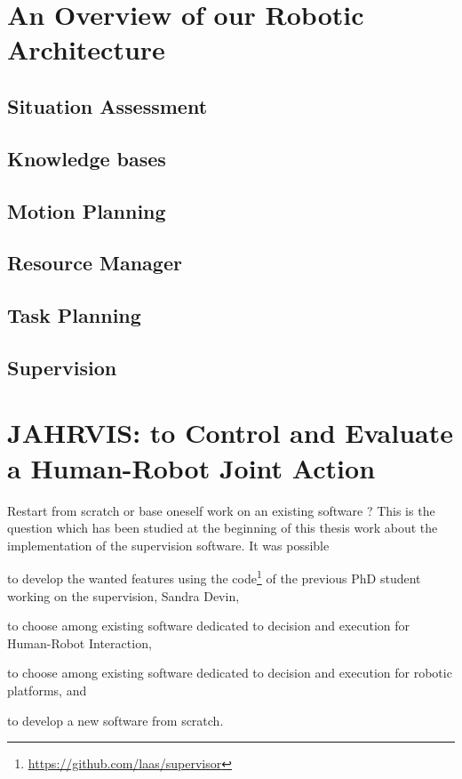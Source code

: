 \documentclass[a4paper,11pt,twoside]{StyleThese}
\begin{document}
\section{An Overview of our Robotic Architecture}\label{chap2:sec:rob_archi}

\subsection{Situation Assessment}

\subsection{Knowledge bases}

\subsection{Motion Planning}

\subsection{Resource Manager}

\subsection{Task Planning}

\subsection{Supervision}

\section{JAHRVIS: to Control and Evaluate a Human-Robot Joint Action}

Restart from scratch or base oneself work on an existing software ? This is the question which has been studied at the beginning of this thesis work about the implementation of the supervision software. It was possible 
\begin{enumerate*}[label={(\arabic*)}]
	\item to develop the wanted features using the code\footnote{\url{https://github.com/laas/supervisor}} of the previous PhD student working on the supervision, Sandra Devin,\label{chap2:list:sandra}
	\item to choose among existing software dedicated to decision and execution for Human-Robot Interaction,\label{chap2:list:soft_hri}
	\item to choose among existing software dedicated to decision and execution for robotic platforms, and\label{chap2:list:robot}
	\item to develop a new software from scratch.\label{chap2:list:new}
\end{enumerate*}
\end{document}
